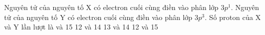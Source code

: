 \documentclass[Main.tex]{subfiles}
\begin{document}
	\begin{ex}
		Nguyên tử của nguyên tố X có electron cuối cùng điền vào phân lớp $3p^1$. Nguyên tử của nguyên tố Y có electron cuối cùng điền vào phân lớp $3p^3$. Số proton của X và Y lần lượt là
		\choice
		{ và 15}
		{12 và 14}
		{13 và 14}
		{12 và 15}
	\end{ex}
\end{document}
